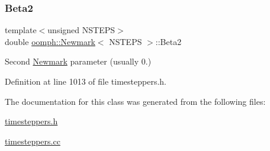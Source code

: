 \subsubsection{\texorpdfstring{Beta2}{Beta2}}
{\footnotesize\ttfamily template$<$unsigned N\+S\+T\+E\+PS$>$ \\
double \hyperlink{classoomph_1_1Newmark}{oomph\+::\+Newmark}$<$ N\+S\+T\+E\+PS $>$\+::Beta2\hspace{0.3cm}{\ttfamily [protected]}}



Second \hyperlink{classoomph_1_1Newmark}{Newmark} parameter (usually 0.) 



Definition at line 1013 of file timesteppers.\+h.



The documentation for this class was generated from the following files\+:\begin{DoxyCompactItemize}
\item 
\hyperlink{timesteppers_8h}{timesteppers.\+h}\item 
\hyperlink{timesteppers_8cc}{timesteppers.\+cc}\end{DoxyCompactItemize}
